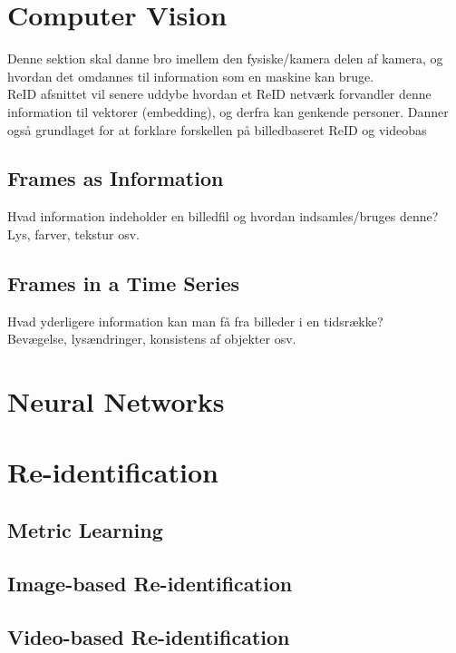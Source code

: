\section{Computer Vision}
Denne sektion skal danne bro imellem den fysiske/kamera delen af kamera, og hvordan det omdannes til information som en maskine kan bruge. 
\\ ReID afsnittet vil senere uddybe hvordan et ReID netværk forvandler denne information til vektorer (embedding), og derfra kan genkende personer. Danner også grundlaget for at forklare forskellen på billedbaseret ReID og videobas
\\ 

\subsection{Frames as Information}
Hvad information indeholder en billedfil og hvordan indsamles/bruges denne?
\\ Lys, farver, tekstur osv. 

\subsection{Frames in a Time Series}
Hvad yderligere information kan man få fra billeder i en tidsrække? 
\\ Bevægelse, lysændringer, konsistens af objekter osv.

\section{Neural Networks}



\section{Re-identification}


\subsection{Metric Learning}


\subsection{Image-based Re-identification}


\subsection{Video-based Re-identification}



